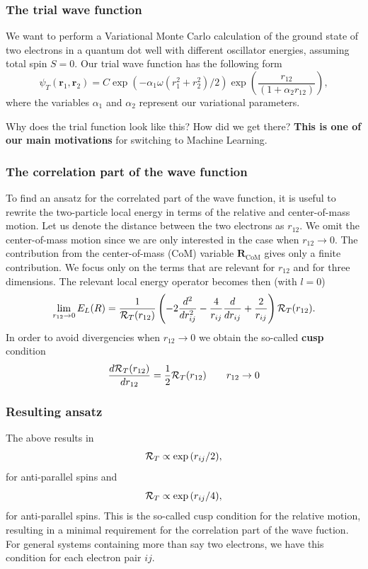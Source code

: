 \documentclass{beamer}
\begin{document}
\begin{frame}
\frametitle{The trial wave function}

\begin{block}{}
We want to perform  a Variational Monte Carlo calculation of the ground state of two electrons in a quantum dot well with different oscillator energies, assuming total spin $S=0$.
Our trial wave function has the following form
\begin{equation}
   \psi_{T}(\bm{r}_1,\bm{r}_2) = 
   C\exp{\left(-\alpha_1\omega(r_1^2+r_2^2)/2\right)}
   \exp{\left(\frac{r_{12}}{(1+\alpha_2 r_{12})}\right)}, 
\label{eq:trial}
\end{equation}
where the variables $\alpha_1$ and $\alpha_2$ represent our variational parameters.

Why does the trial function look like this? How did we get there? \textbf{This is one of our main motivations} for switching to
Machine Learning.

\end{block}
\end{frame}

\begin{frame}
\frametitle{The correlation part of the wave function}

To find an ansatz for the correlated part of the wave function, it is useful to rewrite the two-particle
local energy in terms of the relative and center-of-mass motion.
Let us denote the distance between the two electrons as
$r_{12}$. We omit the center-of-mass motion since we are only interested in the case when
$r_{12} \rightarrow 0$. The contribution from the center-of-mass (CoM) variable $\bm{R}_{\mathrm{CoM}}$
gives only a finite contribution.
We focus only on the terms that are relevant for $r_{12}$ and for three dimensions. The relevant local energy operator becomes then (with $l=0$)
\[
\lim_{r_{12} \rightarrow 0}E_L(R)=
    \frac{1}{{\cal R}_T(r_{12})}\left(-2\frac{d^2}{dr_{ij}^2}-\frac{4}{r_{ij}}\frac{d}{dr_{ij}}+
\frac{2}{r_{ij}}\right){\cal R}_T(r_{12}).
\]
In order to avoid divergencies when $r_{12}\rightarrow 0$ we obtain  the so-called \textbf{cusp} condition
\[
\frac{d {\cal R}_T(r_{12})}{dr_{12}} = \frac{1}{2}
{\cal R}_T(r_{12})\qquad r_{12}\to 0
\]
\end{frame}

\begin{frame}
\frametitle{Resulting ansatz}

The above  results in
\[
{\cal R}_T  \propto \exp{(r_{ij}/2)}, 
\]
for anti-parallel spins and 
\[
{\cal R}_T  \propto \exp{(r_{ij}/4)}, 
\]
for anti-parallel spins. 
This is the so-called cusp condition for the relative motion, resulting in a minimal requirement
for the correlation part of the wave fuction.
For general systems containing more than say two electrons, we have this
condition for each electron pair $ij$.
\end{frame}
\end{document}
